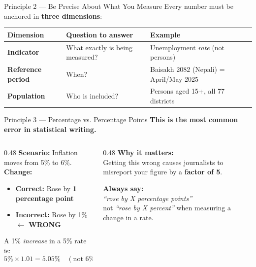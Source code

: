 \documentclass[xcolor={table,dvipsnames},aspectratio=169,11pt]{beamer}
\begin{document}
\begin{frame}{Principle 2 --- Be Precise About What You Measure}
    Every number must be anchored in \textbf{three dimensions}:
    \vskip 0.4cm
    \small
    \begin{tabular}{llp{6.5cm}}
    \toprule
    \rowcolor{nsoBlue}\color{white}\bfseries Dimension & \color{white}\bfseries Question to answer & \color{white}\bfseries Example \\
    \midrule
    \textbf{Indicator} & What exactly is being measured? & Unemployment \emph{rate} (not persons) \\
    \textbf{Reference period} & When? & Baisakh 2082 (Nepali) = April/May 2025 \\
    \textbf{Population} & Who is included? & Persons aged 15+, all 77 districts \\
    \bottomrule
    \end{tabular}
\end{frame}

\begin{frame}{Principle 3 --- Percentage vs. Percentage Points}
    \textbf{This is the most common error in statistical writing.}
    \vskip 0.2cm
    \begin{columns}[t]
    \begin{column}{0.48\textwidth}
        \textbf{Scenario:} Inflation moves from 5\% to 6\%. \\[6pt]
        \textbf{Change:}
        \begin{itemize}
            \item \textcolor{goodBorder}{\textbf{Correct:}} Rose by \textbf{1 percentage point}
            \item \textcolor{badBorder}{\textbf{Incorrect:}} Rose by 1\% $\leftarrow$ \textbf{WRONG}
        \end{itemize}
        \vskip 0.2cm
        A 1\% \emph{increase} in a 5\% rate is:
        $$5\% \times 1.01 = 5.05\% \quad (\text{not } 6\%)$$
    \end{column}
    \begin{column}{0.48\textwidth}
        \textbf{Why it matters:} \\[6pt]
        Getting this wrong causes journalists to misreport your figure by a \textbf{factor of 5}.
        \vskip 0.3cm
        \begin{takeawaybox}
        \footnotesize \textbf{Always say:} \\[2pt]
        \emph{``rose by X percentage points''} \\[2pt]
        not \emph{``rose by X percent''} when measuring a change in a rate.
        \end{takeawaybox}
    \end{column}
    \end{columns}
\end{frame}
\end{document}
